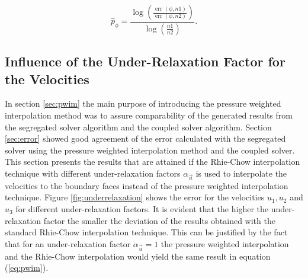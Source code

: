 \begin{displaymath}
  \hat{p}_{\phi} = \frac{\log\left(\frac{\operatorname{err}(\phi,{n1})}{\operatorname{err}(\phi,{n2})}\right)}{\log\left(\frac{n1}{n2}\right)}.
\end{displaymath}

\subsection{Influence of the Under-Relaxation Factor for the Velocities}
\label{sec:independence}

In section \ref{sec:pwim} the main purpose of introducing the pressure weighted interpolation method was to assure comparability of the generated results from the segregated solver algorithm and the coupled solver algorithm. Section \ref{sec:error} showed good agreement of the error calculated with the segregated solver using the pressure weighted interpolation method and the coupled solver. This section presents the results that are attained if the Rhie-Chow interpolation technique with different under-relaxation factors \(\alpha_\vec{u}\) is used to interpolate the velocities to the boundary faces instead of the pressure weighted interpolation technique. Figure \ref{fig:underrelaxation} shows the error for the velocities \(u_1, u_2\) and \(u_3\) for different under-relaxation factors. It is evident that the higher the under-relaxation factor the smaller the deviation of the results obtained with the standard Rhie-Chow interpolation technique. This can be justified by the fact that for an under-relaxation factor \(\alpha_\vec{u} = 1\) the pressure weighted interpolation and the Rhie-Chow interpolation would yield the same result in equation (\ref{eq:pwim}).

